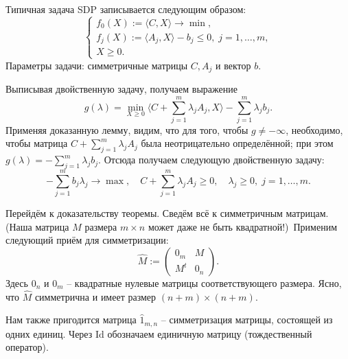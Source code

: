\documentclass[handout]{beamer}
\renewcommand\le{\leqslant}
\renewcommand\ge{\geqslant}
\begin{document}
\begin{frame}
        Типичная задача SDP записывается следующим образом:
        $$
        \begin{cases}
        f_0(X) := \langle C,X\rangle \to\min,\\
        f_j(X) := \langle A_j,X\rangle - b_j \le 0,\;j=1,\ldots,m,\\
        X\ge 0.
        \end{cases}
        $$
        Параметры задачи: симметричные матрицы $C, A_j$ и вектор $b$.
    \pause

        Выписывая двойственную задачу, получаем выражение
        $$
        g(\lambda) = \min_{X\ge 0} \langle C+\sum_{j=1}^m\lambda_jA_j, X\rangle - \sum_{j=1}^m \lambda_jb_j.
        $$
        Применяя доказанную лемму, видим, что для того, чтобы $g\neq
        -\infty$, необходимо, чтобы матрица $C+\sum_{j=1}^m \lambda_jA_j$
        была неотрицательно определённой; при этом $g(\lambda) =
        -\sum_{j=1}^m\lambda_jb_j$. Отсюда получаем следующую двойственную
        задачу:
    \pause\vspace{5pt}
        $$
        -\sum_{j=1}^m b_j\lambda_j\to\max,\quad C + \sum_{j=1}^m \lambda_jA_j
        \ge 0,\quad\lambda_j \ge 0,\;j=1,\ldots,m.
        $$
\end{frame}

\begin{frame}

    Перейдём к доказательству теоремы.
    Сведём всё к симметричным матрицам. (Наша матрица $M$ размера $m\times n$
    может даже не быть квадратной!)\pause~Применим следующий приём для симметризации:
    $$
    \widehat M := \begin{pmatrix} 0_m & M \\ M^t & 0_n \end{pmatrix}.
    $$
        Здесь $0_n$ и $0_m$ -- квадратные нулевые матрицы соответствующего
        размера. Ясно, что $\widehat M$ симметрична и имеет размер $
        (n+m)\times(n+m)$.
    \pause\vspace{5pt}

        Нам также пригодится матрица $\widehat 1_{m,n}$ -- симметризация матрицы, состоящей из одних единиц. Через
        $\mathrm{Id}$ обозначаем единичную матрицу (тождественный оператор).
\end{frame}
\end{document}
